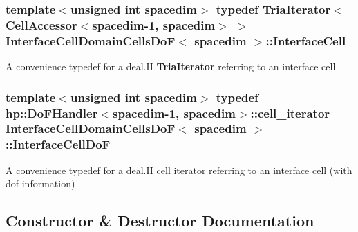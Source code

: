 \subsubsection[{\texorpdfstring{Interface\+Cell}{InterfaceCell}}]{\setlength{\rightskip}{0pt plus 5cm}template$<$unsigned int spacedim$>$ typedef {\bf Tria\+Iterator}$<${\bf Cell\+Accessor}$<$spacedim-\/1, spacedim$>$ $>$ {\bf Interface\+Cell\+Domain\+Cells\+DoF}$<$ spacedim $>$\+::{\bf Interface\+Cell}}\hypertarget{class_interface_cell_domain_cells_do_f_a55783857b93a31baac5a6e6ee3dad22f}{}\label{class_interface_cell_domain_cells_do_f_a55783857b93a31baac5a6e6ee3dad22f}
A convenience typedef for a deal.\+II {\bf Tria\+Iterator} referring to an interface cell 
\subsubsection[{\texorpdfstring{Interface\+Cell\+DoF}{InterfaceCellDoF}}]{\setlength{\rightskip}{0pt plus 5cm}template$<$unsigned int spacedim$>$ typedef {\bf hp\+::\+Do\+F\+Handler}$<$spacedim-\/1, spacedim$>$\+::{\bf cell\+\_\+iterator} {\bf Interface\+Cell\+Domain\+Cells\+DoF}$<$ spacedim $>$\+::{\bf Interface\+Cell\+DoF}}\hypertarget{class_interface_cell_domain_cells_do_f_a65f6a62d58c8378667cab3df94251ab6}{}\label{class_interface_cell_domain_cells_do_f_a65f6a62d58c8378667cab3df94251ab6}
A convenience typedef for a deal.\+II cell iterator referring to an interface cell (with dof information) 

\subsection{Constructor \& Destructor Documentation}

